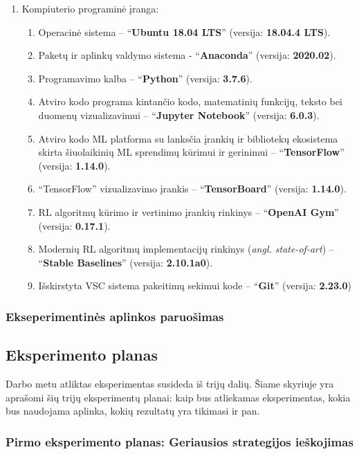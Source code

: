 \documentclass{VUMIFPSbakalaurinis}
\begin{document}
{\begin{enumerate}
	\item Kompiuterio programinė įranga:
	\begin{enumerate}
		\item Operacinė sistema -- \enquote{\textbf{Ubuntu 18.04 LTS}} (versija: \textbf{18.04.4 LTS}).
		\item Paketų ir aplinkų valdymo sistema - \enquote{\textbf{Anaconda}}  (versija: \textbf{2020.02}).
		\item Programavimo kalba -- \enquote{\textbf{Python}} (versija: \textbf{3.7.6}).
		\item Atviro kodo programa kintančio kodo, matematinių funkcijų, teksto bei duomenų vizualizavimui -- \enquote{\textbf{Jupyter Notebook}}  (versija: \textbf{6.0.3}).
		\item Atviro kodo ML platforma su lanksčia įrankių ir bibliotekų ekosistema skirta šiuolaikinių ML sprendimų kūrimui ir gerinimui -- \enquote{\textbf{TensorFlow}} (versija: \textbf{1.14.0}).
		\item \enquote{TensorFlow} vizualizavimo įrankis -- \enquote{\textbf{TensorBoard}} (versija: \textbf{1.14.0}).
		\item RL algoritmų kūrimo ir vertinimo įrankių rinkinys -- \enquote{\textbf{OpenAI Gym}} (versija: \textbf{0.17.1}).
		\item Modernių RL algoritmų implementacijų rinkinys (\textit{angl. state-of-art}) -- \enquote{\textbf{Stable Baselines}} (versija: \textbf{2.10.1a0}).
		\item Išskirstyta VSC sistema pakeitimų sekimui kode -- \enquote{\textbf{Git}} (versija: \textbf{2.23.0}) 
	\end{enumerate}
\end{enumerate}
}
\subsubsection{Ekseperimentinės aplinkos paruošimas}

\subsection{Eksperimento planas}
{
	Darbo metu atliktas eksperimentas susideda iš trijų dalių. Šiame skyriuje yra aprašomi šių trijų eksperimentų planai: kaip bus atliekamas eksperimentas, kokia bus naudojama aplinka, kokių rezultatų yra tikimasi ir pan.
}
\subsubsection{Pirmo eksperimento planas: Geriausios strategijos ieškojimas}
\end{document}

